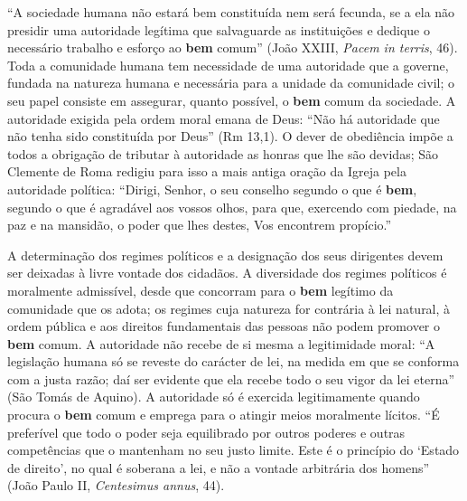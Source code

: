 ``A sociedade humana não estará bem constituída nem será fecunda, se a ela não presidir uma autoridade legítima que salvaguarde as instituições e dedique o necessário trabalho e esforço ao \textbf{bem} comum'' (João XXIII, \textit{Pacem in terris}, 46). Toda a comunidade humana tem necessidade de uma autoridade que a governe, fundada na natureza humana e necessária para a unidade da comunidade civil; o seu papel consiste em assegurar, quanto possível, o \textbf{bem} comum da sociedade. A autoridade exigida pela ordem moral emana de Deus: ``Não há autoridade que não tenha sido constituída por Deus'' (Rm 13,1). O dever de obediência impõe a todos a obrigação de tributar à autoridade as honras que lhe são devidas; São Clemente de Roma redigiu para isso a mais antiga oração da Igreja pela autoridade política: ``Dirigi, Senhor, o seu conselho segundo o que é \textbf{bem}, segundo o que é agradável aos vossos olhos, para que, exercendo com piedade, na paz e na mansidão, o poder que lhes destes, Vos encontrem propício.''

A determinação dos regimes políticos e a designação dos seus dirigentes devem ser deixadas à livre vontade dos cidadãos. A diversidade dos regimes políticos é moralmente admissível, desde que concorram para o \textbf{bem} legítimo da comunidade que os adota; os regimes cuja natureza for contrária à lei natural, à ordem pública e aos direitos fundamentais das pessoas não podem promover o \textbf{bem} comum. A autoridade não recebe de si mesma a legitimidade moral: ``A legislação humana só se reveste do carácter de lei, na medida em que se conforma com a justa razão; daí ser evidente que ela recebe todo o seu vigor da lei eterna'' (São Tomás de Aquino). A autoridade só é exercida legitimamente quando procura o \textbf{bem} comum e emprega para o atingir meios moralmente lícitos. ``É preferível que todo o poder seja equilibrado por outros poderes e outras competências que o mantenham no seu justo limite. Este é o princípio do `Estado de direito', no qual é soberana a lei, e não a vontade arbitrária dos homens'' (João Paulo II, \textit{Centesimus annus}, 44).

